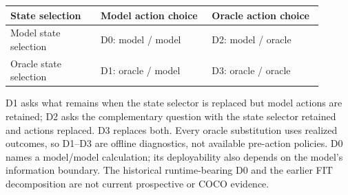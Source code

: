 \begin{center}
\begin{minipage}{\linewidth}
\centering\small
{}
\label{tab:selector_action_framework}
\begin{tabular}{@{}p{0.26\linewidth}p{0.32\linewidth}p{0.32\linewidth}@{}}
\toprule
State selection & Model action choice & Oracle action choice \\
\midrule
Model state selection & D0: model / model & D2: model / oracle \\
Oracle state selection & D1: oracle / model & D3: oracle / oracle \\
\bottomrule
\end{tabular}
\par\smallskip\raggedright
D1 asks what remains when the state selector is replaced but model actions
are retained; D2 asks the complementary question with the state selector
retained and actions replaced. D3 replaces both. Every oracle substitution
uses realized outcomes, so D1--D3 are offline diagnostics, not available
pre-action policies. D0 names a model/model calculation; its deployability
also depends on the model's information boundary. The historical
runtime-bearing D0 and the earlier FIT decomposition are not current
prospective or COCO evidence.
\end{minipage}
\end{center}
